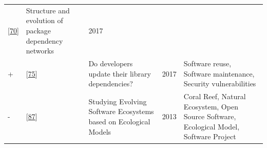 \documentclass[]{book}
\begin{document}
\begin{longtable}[]{@{}lllll@{}}
\begin{minipage}[t]{0.09\columnwidth}
{[}\protect\hyperlink{ref-Kikas2017}{70}{]}\strut
\end{minipage} & \begin{minipage}[t]{0.34\columnwidth}\raggedright\strut
Structure and evolution of package dependency networks\strut
\end{minipage} & \begin{minipage}[t]{0.02\columnwidth}\raggedright\strut
2017\strut
\end{minipage} & \begin{minipage}[t]{0.39\columnwidth}\raggedright\strut
\strut
\end{minipage}\tabularnewline
\begin{minipage}[t]{0.01\columnwidth}\raggedright\strut
+\strut
\end{minipage} & \begin{minipage}[t]{0.09\columnwidth}\raggedright\strut
{[}\protect\hyperlink{ref-Kula2017}{75}{]}\strut
\end{minipage} & \begin{minipage}[t]{0.34\columnwidth}\raggedright\strut
Do developers update their library dependencies?\strut
\end{minipage} & \begin{minipage}[t]{0.02\columnwidth}\raggedright\strut
2017\strut
\end{minipage} & \begin{minipage}[t]{0.39\columnwidth}\raggedright\strut
Software reuse, Software maintenance, Security vulnerabilities\strut
\end{minipage}\tabularnewline
\begin{minipage}[t]{0.01\columnwidth}\raggedright\strut
-\strut
\end{minipage} & \begin{minipage}[t]{0.09\columnwidth}\raggedright\strut
{[}\protect\hyperlink{ref-Mens2013}{87}{]}\strut
\end{minipage} & \begin{minipage}[t]{0.34\columnwidth}\raggedright\strut
Studying Evolving Software Ecosystems based on Ecological Models\strut
\end{minipage} & \begin{minipage}[t]{0.02\columnwidth}\raggedright\strut
2013\strut
\end{minipage} & \begin{minipage}[t]{0.39\columnwidth}\raggedright\strut
Coral Reef, Natural Ecosystem, Open Source Software, Ecological Model,
Software Project\strut
\end{minipage}\tabularnewline

\end{longtable}
\end{document}
